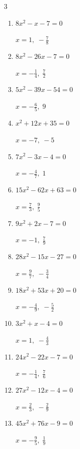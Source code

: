 \begin{multicols}{3}
\begin{enumerate}
  \item $8x^{2}-x-7=0$

        $\displaystyle x=1,\; -\frac{7}{8}$

  \item $8x^{2}-26x-7=0$

        $\displaystyle x=-\frac{1}{4},\; \frac{7}{2}$

  \item $5x^{2}-39x-54=0$

        $\displaystyle x=-\frac{6}{5},\; 9$

  \item $x^{2}+12x+35=0$

        $\displaystyle x=-7,\; -5$

\columnbreak %

\resetques

  \item $7x^{2}-3x-4=0$

        $\displaystyle x=-\frac{4}{7},\; 1$

  \item $15x^{2}-62x+63=0$

        $\displaystyle x=\frac{7}{3},\; \frac{9}{5}$

  \item $9x^{2}+2x-7=0$

        $\displaystyle x=-1,\; \frac{7}{9}$

  \item $28x^{2}-15x-27=0$

        $\displaystyle x=\frac{9}{7},\; -\frac{3}{4}$

  \item $18x^{2}+53x+20=0$

        $\displaystyle x=-\frac{4}{9},\; -\frac{5}{2}$

  \item $3x^{2}+x-4=0$

        $\displaystyle x=1,\; -\frac{4}{3}$

  \item $24x^{2}-22x-7=0$

        $\displaystyle x=-\frac{1}{4},\; \frac{7}{6}$

  \item $27x^{2}-12x-4=0$

        $\displaystyle x=\frac{2}{3},\; -\frac{2}{9}$

  \item $45x^{2}+76x-9=0$

        $\displaystyle x=-\frac{9}{5},\; \frac{1}{9}$


\end{enumerate}
\end{multicols}
